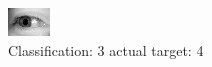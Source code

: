 \begin{figure}[h!]
\begin{center}
\includegraphics[width=0.60\columnwidth]{figures/ID3189_class_3_target_4.png}
\end{center}
\caption{ Classification: 3 actual target: 4}
\label{fig:ID3189_class_3_target_4}
\end{figure}
